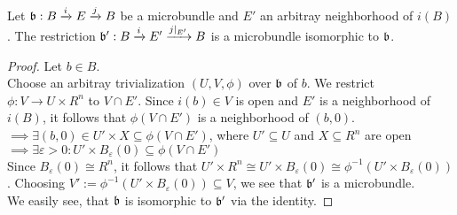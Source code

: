 
 \\
Let $\bb: \bundle{B}{E}{i}{j}$ be a microbundle and $E'$ an arbitray neighborhood of $i(B)$.
The restriction $\bundledef{\bb'}{B}{E'}{i}{j\restrict{E'}}$ is a microbundle isomorphic to $\bb$.
\begin{proof}
Let $b \in B$. \\
Choose an arbitray trivialization $(U, V, \phi)$ over $\bb$ of $b$.
We restrict $\phi: V \to U \times R^n$ to $V \cap E'$.
Since $i(b) \in V$ is open and $E'$ is a neighborhood of $i(B)$, it follows that $\phi(V \cap E')$ is a neighborhood of $(b, 0)$.
\\ $\implies \exists (b, 0) \in U' \times X \subseteq \phi(V \cap E')$, where $U' \subseteq U$ and $X \subseteq R^n$ are open
\\ $\implies \exists \varepsilon > 0: U' \times B_\varepsilon(0) \subseteq \phi(V \cap E')$ \\
Since $B_\varepsilon(0) \cong R^n$, it follows that $U' \times R^n \cong U' \times B_\varepsilon(0) \cong \phi^{-1}(U' \times B_\varepsilon(0))$.
Choosing $V' := \phi^{-1}(U' \times B_\varepsilon(0)) \subseteq V$, we see that $\bb'$ is a microbundle.
\\ We easily see, that $\bb$ is isomorphic to $\bb'$ via the identity.
\end{proof}